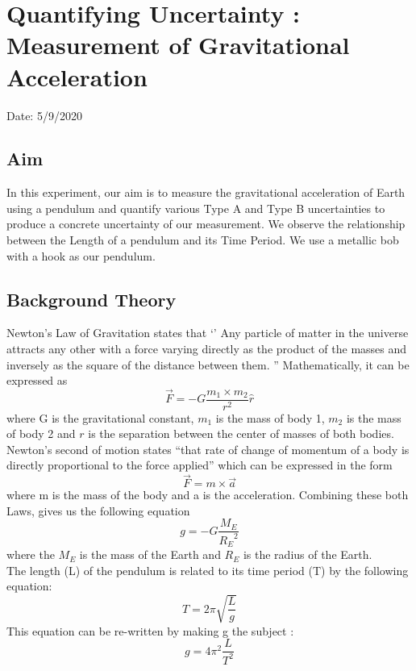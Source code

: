 \chapter{Quantifying Uncertainty : Measurement of Gravitational Acceleration}

Date: 5/9/2020

\section{Aim}

In this experiment, our aim is to measure the gravitational acceleration of Earth using a pendulum and quantify various Type A and Type B uncertainties to produce a concrete uncertainty of our measurement. We observe the relationship between the Length of a pendulum and its Time Period. We use a metallic bob with a hook as our pendulum.

\section{Background Theory}

Newton's Law of Gravitation states that `' Any particle of matter in the universe attracts any other with a force varying directly as the product of the masses and inversely as the square of the distance between them. '' Mathematically, it can be expressed as 
$$\vec{F} = -G \frac{m_1 \times m_2}{r^2} \hat{r}$$
where G is the gravitational constant, $m_1$ is the mass of body 1, $m_2$ is the mass of body 2 and $r$ is the separation between the center of masses of both bodies. Newton's second of motion states ``that rate of change of momentum of a body is directly proportional to the force applied'' which can be expressed in the form 
$$ \vec{F} = m \times \vec{a}$$
where m is the mass of the body and a is the acceleration. Combining these both Laws, gives us the following equation
$$ g = -G \frac{M_E}{{R_E}^2} $$
where the $M_E$ is the mass of the Earth and $R_E$ is the radius of the Earth.\\
The length (L) of the pendulum is related to its time period (T) by the following equation:
$$ T = 2\pi\sqrt{\frac{L}{g}} $$
This equation can be re-written by making g the subject :
$$ g = 4\pi^2\frac{L}{T^2} $$

